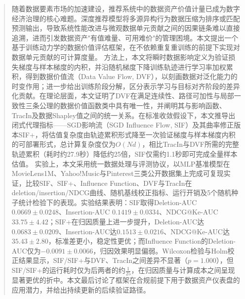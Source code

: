 

\begin{abstract}
随着数据要素市场的加速建设，推荐系统中的数据资产价值计量已成为数字经济治理的核心难题。深度推荐模型将多源异构行为数据压缩为排序或匹配预测输出，导致系统性能改进与微观数据单元贡献之间的因果链条难以直接追溯，进而引发数据资产"有值难量、可用难价"的管理困境。本文提出一个基于训练动力学的数据价值评估框架，在不依赖重复重训练的前提下实现对数据单元贡献的可计算度量。
方法上，本文将瞬时数据影响定义为验证损失梯度与样本梯度的内积，并沿随机梯度下降训练轨迹进行学习率加权累积，得到数据价值流（Data Value Flow, DVF），以刻画数据对泛化能力的时变作用；进一步给出训练阶段分解，区分表示学习与目标对齐阶段的差异化贡献。在理论层面，本文证明了DVF在满足连续性、路径可加性与局部一致性三条公理的数据价值函数类中具有唯一性，并阐明其与影响函数、TracIn及数据Shapley值之间的统一关系。在标准收敛假设下，本文推导出闭式代理指标——SGD影响流（SGD Influence Flow, SIF）及其曲率修正版本SIF+，将估值复杂度由轨迹累积形式降至一次验证梯度与样本梯度内积的可部署形式，总计算复杂度仅为$O(Nd)$，相比TracIn与DVF所需的完整轨迹累积（耗时约27.9秒）降低约25倍，SIF仅需约1.1秒即可完成全量样本估值。
实验上，本文采用统一数据处理与评测协议，以MLP基准模型在MovieLens1M、Yahoo!Music与Pinterest三类公开数据集上完成可复现实证，比较SIF、SIF+、Influence Function、DVF与TracIn在deletion/insertion/NDCG曲线、随机基线校正指标、运行开销及5个随机种子统计检验下的表现。实验结果表明：SIF取得Deletion-AUC $0.0669\pm0.0248$、Insertion-AUC $0.1419\pm0.0334$、NDCG@Ke-AUC $33.75\pm4.42$；SIF+在归因质量上进一步提升，Deletion-AUC达$0.0683\pm0.0209$、Insertion-AUC达$0.1513\pm0.0216$、NDCG@Ke-AUC达$35.43\pm2.80$，标准差更小，稳定性更优；而Influence Function的Deletion-AUC仅为$-0.0091\pm0.0066$，归因效果明显偏弱。Wilcoxon检验与Holm校正结果显示，SIF/SIF+与DVF、TracIn之间差异不显著（$p=1.000$），但SIF/SIF+的运行耗时仅为后两者的约$\frac{1}{25}$，在归因质量与计算成本之间呈现显著更优的折中。本文最后讨论了框架在合规前提下用于数据资产仪表盘的应用潜力，并给出持续更新的后续验证路径。


\end{abstract}



